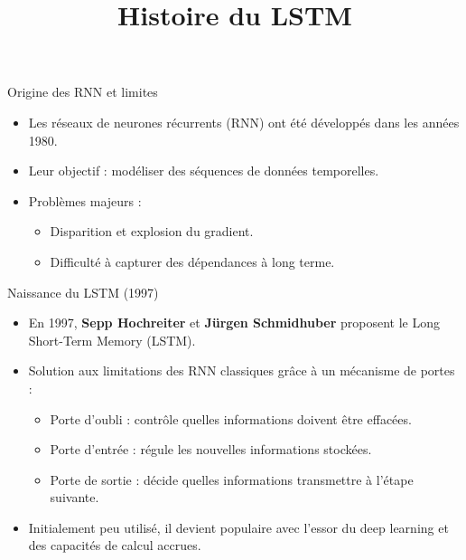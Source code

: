 \documentclass{beamer}
\title{Histoire du LSTM}
\author{}
\date{}
\begin{document}
\begin{frame}
    \titlepage
\end{frame}

\begin{frame}{Origine des RNN et limites}
    \begin{itemize}
        \item Les réseaux de neurones récurrents (RNN) ont été développés dans les années 1980.
        \item Leur objectif : modéliser des séquences de données temporelles.
        \item Problèmes majeurs :
        \begin{itemize}
            \item Disparition et explosion du gradient.
            \item Difficulté à capturer des dépendances à long terme.
        \end{itemize}
    \end{itemize}
\end{frame}

\begin{frame}{Naissance du LSTM (1997)}
    \begin{itemize}
        \item En 1997, \textbf{Sepp Hochreiter} et \textbf{Jürgen Schmidhuber} proposent le Long Short-Term Memory (LSTM).
        \item Solution aux limitations des RNN classiques grâce à un mécanisme de portes :
        \begin{itemize}
            \item Porte d’oubli : contrôle quelles informations doivent être effacées.
            \item Porte d’entrée : régule les nouvelles informations stockées.
            \item Porte de sortie : décide quelles informations transmettre à l’étape suivante.
        \end{itemize}
        \item Initialement peu utilisé, il devient populaire avec l’essor du deep learning et des capacités de calcul accrues.
    \end{itemize}
\end{frame}
\end{document}
